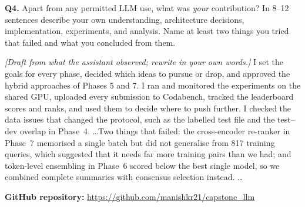 \documentclass[11pt, oneside]{article}
\begin{document}
\medskip
\noindent
\textbf{Q4.} Apart from any permitted LLM use, what was \emph{your} contribution? In 8--12 sentences describe your own understanding, architecture decisions, implementation, experiments, and analysis. Name at least two things you tried that failed and what you concluded from them.

\medskip
\noindent
\textit{[Draft from what the assistant observed; rewrite in your own words.]}  I set the goals for every phase,
decided which ideas to pursue or drop, and approved the hybrid approaches of Phases 5 and 7.  I ran and monitored
the experiments on the shared GPU, uploaded every submission to Codabench, tracked the leaderboard scores and ranks,
and used them to decide where to push further.  I checked the data issues that changed the protocol, such as the
labelled test file and the test--dev overlap in Phase~4.  \ldots  Two things that failed: the cross-encoder
re-ranker in Phase~7 memorised a single batch but did not generalise from 817 training queries, which suggested that
it needs far more training pairs than we had; and token-level ensembling in Phase~6 scored below the best single
model, so we combined complete summaries with consensus selection instead.  \ldots

\medskip
\noindent\textbf{GitHub repository:} \url{https://github.com/manishkr21/capstone_llm}




\clearpage
\appendix

\end{document}
